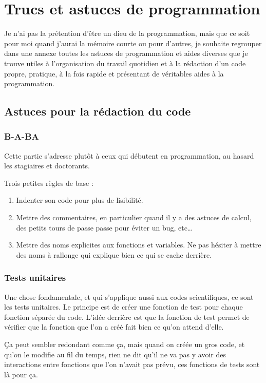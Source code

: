 \chapter{Trucs et astuces de programmation}
Je n'ai pas la prétention d'être un dieu de la programmation, mais que ce soit pour moi quand j'aurai la mémoire courte ou pour d'autres, je souhaite regrouper dans une annexe toutes les astuces de programmation et aides diverses que je trouve utiles à l'organisation du travail quotidien et à la rédaction d'un code propre, pratique, à la fois rapide et présentant de véritables aides à la programmation. 


\section{Astuces pour la rédaction du code}
\subsection{B-A-BA}
Cette partie s'adresse plutôt à ceux qui débutent en programmation, au hasard les stagiaires et doctorants. 

Trois petites règles de base : 
\begin{enumerate}
\item Indenter son code pour plus de lisibilité.
\item Mettre des commentaires, en particulier quand il y a des astuces de calcul, des petits tours de passe passe pour éviter un bug, etc\dots
\item Mettre des noms explicites aux fonctions et variables. Ne pas hésiter à mettre des noms à rallonge qui explique bien ce qui se cache derrière. 
\end{enumerate}

\subsection{Tests unitaires}
Une chose fondamentale, et qui s'applique aussi aux codes scientifiques, ce sont les tests unitaires. Le principe est de créer une fonction de test pour chaque fonction séparée du code. L'idée derrière est que la fonction de test permet de vérifier que la fonction que l'on a créé fait bien ce qu'on attend d'elle. 

Ça peut sembler redondant comme ça, mais quand on créée un gros code, et qu'on le modifie au fil du temps, rien ne dit qu'il ne va pas y avoir des interactions entre fonctions que l'on n'avait pas prévu, ces fonctions de tests sont là pour ça. 

